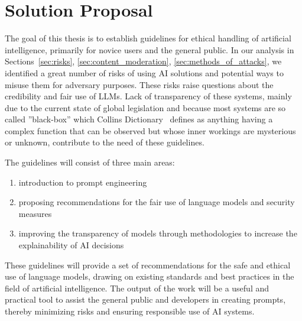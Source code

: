 \chapter{Solution Proposal}

The goal of this thesis is to establish guidelines for ethical handling of artificial intelligence, primarily for novice users and the general public. In our analysis in Sections~\ref{sec:risks}, \ref{sec:content_moderation}, \ref{sec:methods_of_attacks}, we identified a great number of risks of using AI solutions and potential ways to misuse them for adversary purposes. These risks raise questions about the credibility and fair use of LLMs. Lack of transparency of these systems, mainly due to the current state of global legislation and because most systems are so called ''black-box'' which Collins Dictionary~\cite{Collins_BlackBox} defines as anything having a complex function that can be observed but whose inner workings are mysterious or unknown, contribute to the need of these guidelines. 


The guidelines will consist of three main areas:
\begin{enumerate}
    \item introduction to prompt engineering
    \item proposing recommendations for the fair use of language models and security measures
    \item improving the transparency of models through methodologies to increase the explainability of AI decisions %
\end{enumerate}

These guidelines will provide a set of recommendations for the safe and ethical use of language models, drawing on existing standards and best practices in the field of artificial intelligence. The output of the work will be a useful and practical tool to assist the general public and developers in creating prompts, thereby minimizing risks and ensuring responsible use of AI systems.